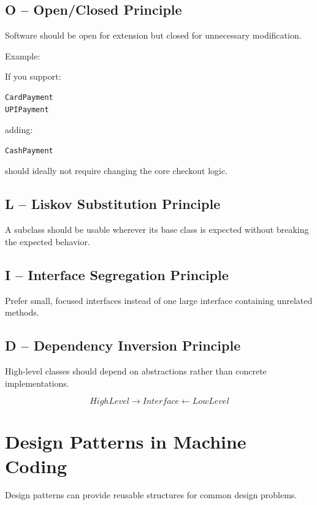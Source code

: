 \documentclass[12pt,a4paper]{article}
\begin{document}
\subsection{O -- Open/Closed Principle}

Software should be open for extension but closed for unnecessary modification.

Example:

If you support:

\begin{verbatim}
CardPayment
UPIPayment
\end{verbatim}

adding:

\begin{verbatim}
CashPayment
\end{verbatim}

should ideally not require changing the core checkout logic.

\subsection{L -- Liskov Substitution Principle}

A subclass should be usable wherever its base class is expected without breaking the expected behavior.

\subsection{I -- Interface Segregation Principle}

Prefer small, focused interfaces instead of one large interface containing unrelated methods.

\subsection{D -- Dependency Inversion Principle}

High-level classes should depend on abstractions rather than concrete implementations.

\[
HighLevel \rightarrow Interface \leftarrow LowLevel
\]

\section{Design Patterns in Machine Coding}

Design patterns can provide reusable structures for common design problems.
\end{document}
